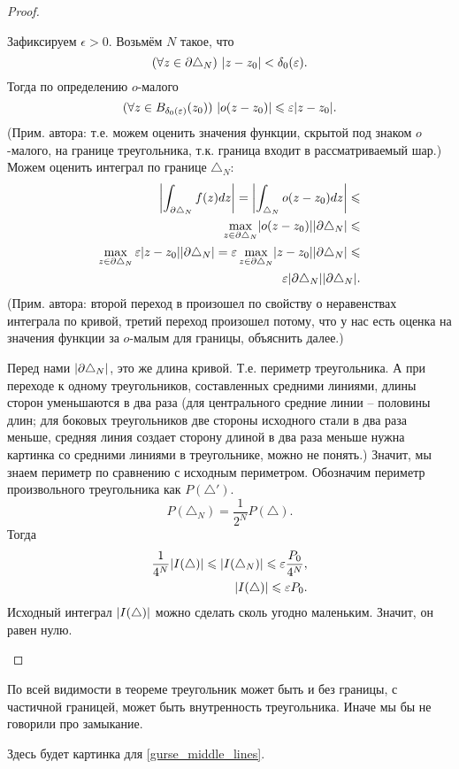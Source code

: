 \begin{proof}
\begin{enumerate}
		Зафиксируем $\epsilon > 0$. Возьмём $N$ такое, что
		\[
			(\forall z \in \partial \triangle_N) \,\, \mathopen{}\left\lvert z - z_0\right\rvert\mathclose{} < \delta_0(\varepsilon).
		\]
		Тогда по определению $o$-малого
		\[
			(\forall z \in B_{\delta_0(\varepsilon)}(z_0)) \,\, \mathopen{}\left\lvert o(z - z_0)\right\rvert\mathclose{} \leqslant \varepsilon \mathopen{}\left\lvert z - z_0\right\rvert\mathclose{}.
		\]
		(Прим. автора: т.е. можем оценить значения функции, скрытой под знаком $o$-малого, на границе треугольника, т.к. граница входит в рассматриваемый шар.)
		Можем оценить интеграл по границе $\triangle_N$:
		\[
			\begin{aligned}
				\mathopen{}\left\lvert\int_{\partial \triangle_N} f(z) dz\right\rvert\mathclose{} = \mathopen{}\left\lvert\int_{\triangle_N} o(z - z_0) dz\right\rvert\mathclose{} \leqslant \\
				\max_{z \in \partial \triangle_N} \mathopen{}\left\lvert o(z - z_0)\right\rvert\mathclose{} \mathopen{}\left\lvert\partial \triangle_N\right\rvert\mathclose{} \leqslant \\
				\max_{z \in \partial \triangle_N} \varepsilon \mathopen{}\left\lvert z - z_0\right\rvert\mathclose{} \mathopen{}\left\lvert\partial \triangle_N\right\rvert\mathclose{} = \varepsilon \max_{z \in \partial \triangle_N} \mathopen{}\left\lvert z - z_0\right\rvert\mathclose{} \mathopen{}\left\lvert\partial \triangle_N\right\rvert\mathclose{} \leqslant \\
				\varepsilon \mathopen{}\left\lvert\partial \triangle_N\right\rvert\mathclose{} \mathopen{}\left\lvert\partial \triangle_N\right\rvert\mathclose{}.
			\end{aligned}
		\]
		(Прим. автора: второй переход в произошел по свойству о неравенствах интеграла по кривой, третий переход произошел потому, что у нас есть оценка на значения функции за $o$-малым для границы, {\color{red} объяснить далее}.)
		
		Перед нами $\mathopen{}\left\lvert\partial \triangle_N\right\rvert\mathclose{}$, это же длина кривой. Т.е. периметр треугольника. А при переходе к одному треугольников, составленных средними линиями, длины сторон уменьшаются в два раза (для центрального средние линии -- половины длин; для боковых треугольников две стороны исходного стали в два раза меньше, средняя линия создает сторону длиной в два раза меньше {\color{red} нужна картинка со средними линиями в треугольнике, можно не понять}.) Значит, мы знаем периметр по сравнению с исходным периметром. Обозначим периметр произвольного треугольника как $P(\triangle')$.
		\[
			P(\triangle_N) = \frac{1}{2^N} P(\triangle).
		\]
		Тогда
		\[
			\begin{aligned}
				\frac{1}{4^N} \mathopen{}\left\lvert I(\triangle)\right\rvert\mathclose{} \leqslant \mathopen{}\left\lvert I(\triangle_N)\right\rvert\mathclose{} \leqslant \varepsilon \frac{P_0}{4^N}, \\
				\mathopen{}\left\lvert I(\triangle)\right\rvert\mathclose{} \leqslant \varepsilon P_0.
			\end{aligned}
		\]
		Исходный интеграл $\mathopen{}\left\lvert I(\triangle)\right\rvert\mathclose{}$ можно сделать сколь угодно маленьким. Значит, он равен нулю.
	\end{enumerate}
\end{proof}
\begin{anote}
	По всей видимости в теореме треугольник может быть и без границы, с частичной границей, может быть внутренность треугольника. Иначе мы бы не говорили про замыкание.
\end{anote}
\begin{anote}
	{\color{red} Здесь будет картинка для \ref{gurse_middle_lines}.}
\end{anote}
